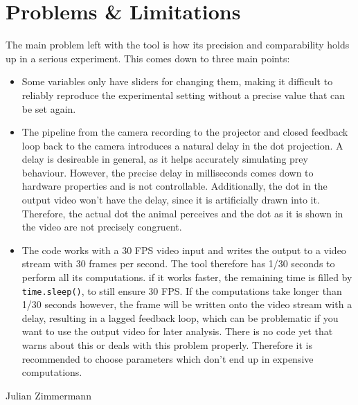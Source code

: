 \documentclass[12pt]{article}
\begin{document}
\section{Problems \& Limitations}
The main problem left with the tool is how its precision and comparability holds up in a serious experiment. This comes down to three main points:
\begin{itemize}
	\item Some variables only have sliders for changing them, making it difficult to reliably reproduce the experimental setting without a precise value that can be set again.
	\item The pipeline from the camera recording to the projector and closed feedback loop back to the camera introduces a natural delay in the dot projection. A delay is desireable in general, as it helps accurately simulating prey behaviour. However, the precise delay in milliseconds comes down to hardware properties and is not controllable. Additionally, the dot in the output video won't have the delay, since it is artificially drawn into it. Therefore, the actual dot the animal perceives and the dot as it is shown in the video are not precisely congruent.
	\item The code works with a 30 FPS video input and writes the output to a video stream with 30 frames per second. The tool therefore has 1/30 seconds to perform all its computations. if it works faster, the remaining time is filled by \Verb|time.sleep()|, to still ensure 30 FPS. If the computations take longer than 1/30 seconds however, the frame will be written onto the video stream with a delay, resulting in a lagged feedback loop, which can be problematic if you want to use the output video for later analysis. There is no code yet that warns about this or deals with this problem properly. Therefore it is recommended to choose parameters which don't end up in expensive computations.
\end{itemize}



\vfill
\hfill Julian Zimmermann
\end{document}
